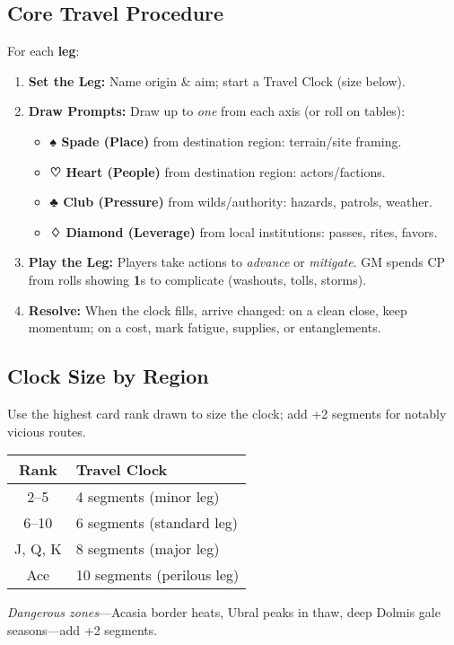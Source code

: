 \begin{multicols}{2}
\subsection*{Core Travel Procedure}
For each \textbf{leg}:
\begin{enumerate}
  \item \textbf{Set the Leg:} Name origin \& aim; start a Travel Clock (size below).
  \item \textbf{Draw Prompts:} Draw up to \emph{one} from each axis (or roll on tables):
  \begin{itemize}
    \item \textbf{♠ Spade (Place)} from destination region: terrain/site framing.
    \item \textbf{♡ Heart (People)} from destination region: actors/factions.
    \item \textbf{♣ Club (Pressure)} from wilds/authority: hazards, patrols, weather.
    \item \textbf{♢ Diamond (Leverage)} from local institutions: passes, rites, favors.
  \end{itemize}
  \item \textbf{Play the Leg:} Players take actions to \emph{advance} or \emph{mitigate}. GM spends CP from rolls showing \textbf{1}s to complicate (washouts, tolls, storms).
  \item \textbf{Resolve:} When the clock fills, arrive changed: on a clean close, keep momentum; on a cost, mark fatigue, supplies, or entanglements.
\end{enumerate}

\subsection*{Clock Size by Region}
Use the highest card rank drawn to size the clock; add +2 segments for notably vicious routes.
\begin{center}
\begin{tabular}{cl}
\toprule
\textbf{Rank} & \textbf{Travel Clock} \\
\midrule
2–5 & 4 segments (minor leg) \\
6–10 & 6 segments (standard leg) \\
J, Q, K & 8 segments (major leg) \\
Ace & 10 segments (perilous leg) \\
\bottomrule
\end{tabular}
\end{center}
\emph{Dangerous zones}—Acasia border heats, Ubral peaks in thaw, deep Dolmis gale seasons—add +2 segments.


\end{multicols}
